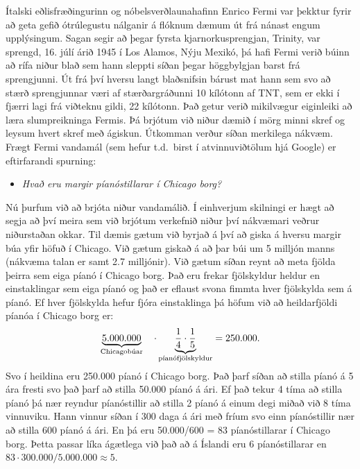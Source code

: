 \ifdefined \wholebook \else\documentclass[oneside]{book}\usepackage{EdlBook}\graphicspath{{figures/}}
\begin{document}
Ítalski eðlisfræðingurinn og nóbelsverðlaunahafinn Enrico Fermi var þekktur fyrir að geta gefið ótrúlegustu nálganir á flóknum dæmum út frá nánast engum upplýsingum. Sagan segir að þegar fyrsta kjarnorkusprengjan, Trinity, var sprengd, 16. júlí árið 1945 í Los Alamos, Nýju Mexikó, þá hafi Fermi verið búinn að rífa niður blað sem hann sleppti síðan þegar höggbylgjan barst frá sprengjunni. Út frá því hversu langt blaðsnifsin bárust mat hann sem svo að stærð sprengjunnar væri af stærðargráðunni 10 kílótonn af TNT, sem er ekki í fjærri lagi frá viðteknu gildi, 22 kílótonn. Það getur verið mikilvægur eiginleiki að læra slumpreikninga Fermis. Þá brjótum við niður dæmið í mörg minni skref og leysum hvert skref með ágiskun. Útkomman verður síðan merkilega nákvæm. 
Frægt Fermi vandamál (sem hefur t.d.~birst í atvinnuviðtölum hjá Google) er eftirfarandi spurning:

\begin{itemize}
    \item \textit{Hvað eru margir píanóstillarar í Chicago borg?}
\end{itemize}

Nú þurfum við að brjóta niður vandamálið. Í einhverjum skilningi er hægt að segja að því meira sem við brjótum verkefnið niður því nákvæmari veðrur niðurstaðan okkar. Til dæmis gætum við byrjað á því að giska á hversu margir búa yfir höfuð í Chicago. Við gætum giskað á að þar búi um 5 milljón manns (nákvæma talan er samt \SI{2.7}{} milljónir). Við gætum síðan reynt að meta fjölda þeirra sem eiga píanó 
í Chicago borg. Það eru frekar fjölskyldur heldur en einstaklingar sem eiga píanó og það er eflaust svona fimmta hver fjölskylda sem á píanó. Ef hver fjölskylda hefur fjóra einstaklinga þá höfum við að heildarfjöldi píanóa í Chicago borg er:
\begin{align*}
    \underbrace{5.000.000}_\textrm{$\text{Chicagobúar}$} \hspace{0.35cm} \cdot \underbrace{\frac{1}{4} \cdot \frac{1}{5}}_\textrm{$\text{píanófjölskyldur}$} = 250.000.
\end{align*}
Svo í heildina eru 250.000 píanó í Chicago borg. Það þarf síðan að stilla píanó á 5 ára fresti svo það þarf að stilla 50.000 píanó á ári. Ef það tekur 4 tíma að stilla píanó þá nær reyndur píanóstillir að stilla 2 píanó á einum degi miðað við 8 tíma vinnuviku. Hann vinnur síðan í 300 daga á ári með fríum svo einn píanóstillir nær að stilla 600 píanó á ári. En þá eru 50.000/600 = 83 píanóstillarar í Chicago borg. Þetta passar líka ágætlega við það að á Íslandi eru 6 píanóstillarar en $83 \cdot 300.000/5.000.000 \approx 5$.
\end{document}
